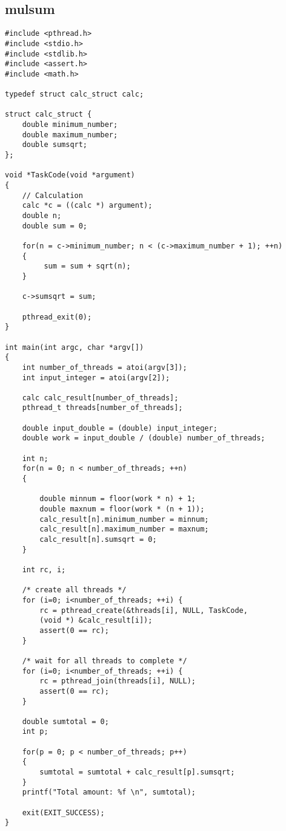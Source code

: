 \subsection{mulsum}
\begin{lstlisting}
#include <pthread.h>
#include <stdio.h>
#include <stdlib.h>
#include <assert.h>
#include <math.h>

typedef struct calc_struct calc;

struct calc_struct {
	double minimum_number;
	double maximum_number;
	double sumsqrt;
};

void *TaskCode(void *argument)
{
	// Calculation
	calc *c = ((calc *) argument);
	double n;
	double sum = 0;
	
	for(n = c->minimum_number; n < (c->maximum_number + 1); ++n)
	{
		 sum = sum + sqrt(n);
	}
	
	c->sumsqrt = sum;
	
	pthread_exit(0);
}

int main(int argc, char *argv[])
{
	int number_of_threads = atoi(argv[3]);
	int input_integer = atoi(argv[2]);

	calc calc_result[number_of_threads];
	pthread_t threads[number_of_threads];

	double input_double = (double) input_integer;
	double work = input_double / (double) number_of_threads;	

	int n;
	for(n = 0; n < number_of_threads; ++n)
	{
		
		double minnum = floor(work * n) + 1;
		double maxnum = floor(work * (n + 1));
		calc_result[n].minimum_number = minnum;
		calc_result[n].maximum_number = maxnum;
		calc_result[n].sumsqrt = 0;	
	}

	int rc, i;

	/* create all threads */
	for (i=0; i<number_of_threads; ++i) {
		rc = pthread_create(&threads[i], NULL, TaskCode, 
		(void *) &calc_result[i]);
		assert(0 == rc);
	}
	
	/* wait for all threads to complete */
	for (i=0; i<number_of_threads; ++i) {
		rc = pthread_join(threads[i], NULL);
		assert(0 == rc);
	}

	double sumtotal = 0;
	int p;

	for(p = 0; p < number_of_threads; p++)
	{
		sumtotal = sumtotal + calc_result[p].sumsqrt;
	}
	printf("Total amount: %f \n", sumtotal);
	
	exit(EXIT_SUCCESS);
}

\end{lstlisting}